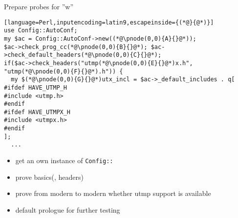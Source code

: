 \documentclass[ngerman,xcolor={table,dvipsnames},smaller,compress,hyperref={bookmarks,colorlinks}]{beamer}%
\begin{document}
\begin{frame}[fragile]{Prepare probes for ''w''}
\begin{block}{}
\scriptsize
\begin{lstlisting}[language=Perl,inputencoding=latin9,escapeinside={(*@}{@*)}]
use Config::AutoConf;
my $ac = Config::AutoConf->new((*@\pnode(0,0){A}{}@*));
$ac->check_prog_cc(*@\pnode(0,0){B}{}@*); $ac->check_default_headers(*@\pnode(0,0){C}{}@*);
if($ac->check_headers("utmp(*@\pnode(0,0){E}{}@*)x.h", "utmp(*@\pnode(0,0){F}{}@*).h")) {
  my $(*@\pnode(0,0){G}{}@*)utx_incl = $ac->_default_includes . q[
#ifdef HAVE_UTMP_H
#include <utmp.h>
#endif
#ifdef HAVE_UTMPX_H
#include <utmpx.h>
#endif
];
  ...
\end{lstlisting}
\end{block} %

\begin{itemize}
\item<2-> get an own instance of \texttt{Config::}

\item<3-> prove basics(,  headers)

\item<4-> prove from  modern to  modern whether utmp support is available

\item<5->  default prologue for further testing

\end{itemize}
\end{frame}
\end{document}
